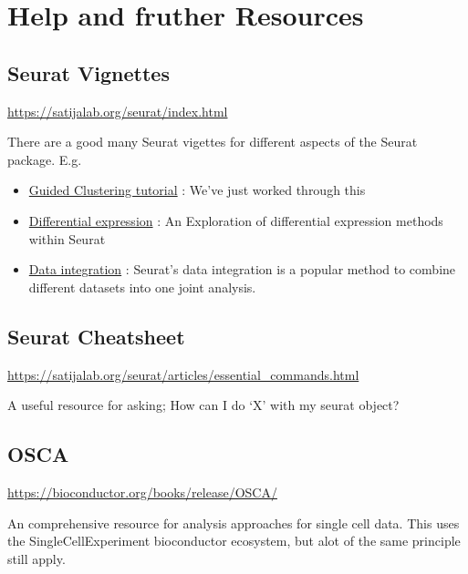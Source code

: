\documentclass[
]{book}
\providecommand{\tightlist}{%
  \setlength{\itemsep}{0pt}\setlength{\parskip}{0pt}}
\begin{document}
\section{Help and fruther Resources}\label{help-and-fruther-resources}

\subsection*{Seurat Vignettes}\label{seurat-vignettes}

\url{https://satijalab.org/seurat/index.html}

There are a good many Seurat vigettes for different aspects of the Seurat package. E.g.

\begin{itemize}
\tightlist
\item
  \href{https://satijalab.org/seurat/articles/pbmc3k_tutorial.html}{Guided Clustering tutorial} : We've just worked through this
\item
  \href{https://satijalab.org/seurat/archive/v3.1/de_vignette.html}{Differential expression} : An Exploration of differential expression methods within Seurat
\item
  \href{https://satijalab.org/seurat/articles/integration_introduction.html}{Data integration} : Seurat's data integration is a popular method to combine different datasets into one joint analysis.
\end{itemize}

\subsection*{Seurat Cheatsheet}\label{seurat-cheatsheet}

\url{https://satijalab.org/seurat/articles/essential_commands.html}

A useful resource for asking; How can I do `X' with my seurat object?

\subsection*{OSCA}\label{osca}

\url{https://bioconductor.org/books/release/OSCA/}

An comprehensive resource for analysis approaches for single cell data.
This uses the SingleCellExperiment bioconductor ecosystem, but alot of the same principle still apply.
\end{document}
